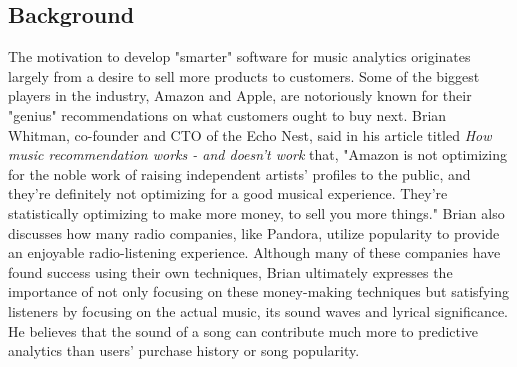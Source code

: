 \documentclass[12pt]{article}
\begin{document}
\subsection{Background}
\label{subsec:background}
The motivation to develop "smarter" software for music analytics originates largely from a desire to sell more products to customers. Some of the biggest players in the industry, Amazon and Apple, are notoriously known for their "genius" recommendations on what customers ought to buy next. Brian Whitman, co-founder and CTO of the Echo Nest, said in his article titled \textit{How music recommendation works - and doesn't work} that, "Amazon is not optimizing for the noble work of raising independent artists' profiles to the public, and they're definitely not optimizing for a good musical experience. They're statistically optimizing to make more money, to sell you more things." Brian also discusses how many radio companies, like Pandora, utilize popularity to provide an enjoyable radio-listening experience. Although many of these companies have found success using their own techniques, Brian ultimately expresses the importance of not only focusing on these money-making techniques but satisfying listeners by focusing on the actual music, its sound waves and lyrical significance. He believes that the sound of a song can contribute much more to predictive analytics than users' purchase history or song popularity.
\end{document}

